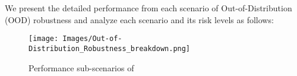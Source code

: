 We present the detailed performance from each scenario of Out-of-Distribution (OOD) robustness and analyze each scenario and its risk levels as follows:
\begin{figure*}[h]
    \centering
    \texttt{[image: Images/Out-of-Distribution\_Robustness\_breakdown.png]}
    \vspace{-0.5in}
    \caption{Performance sub-scenarios of \llm}
\label{fig:ood-radar}
\end{figure*} 